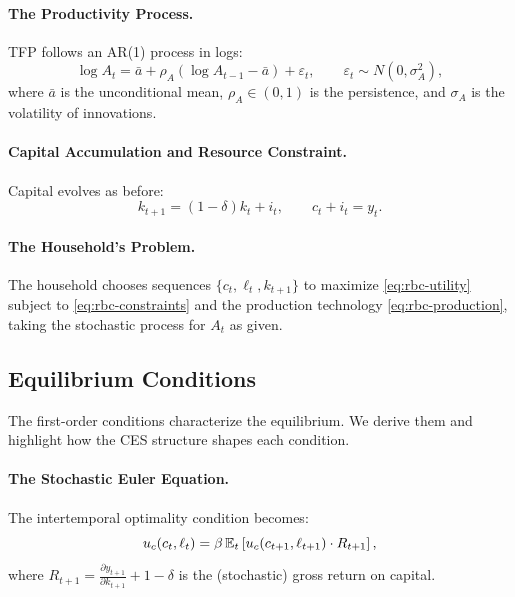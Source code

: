 \paragraph{The Productivity Process.}
TFP follows an AR(1) process in logs:
\begin{equation}
\log A_t = \bar{a} + \rho_A (\log A_{t-1} - \bar{a}) + \varepsilon_t, \qquad \varepsilon_t \sim N(0, \sigma_A^2),
\label{eq:tfp-process}
\end{equation}
where $\bar{a}$ is the unconditional mean, $\rho_A \in (0,1)$ is the persistence, and $\sigma_A$ is the volatility of innovations.

\paragraph{Capital Accumulation and Resource Constraint.}
Capital evolves as before:
\begin{equation}
k_{t+1} = (1 - \delta) k_t + i_t, \qquad c_t + i_t = y_t.
\label{eq:rbc-constraints}
\end{equation}

\paragraph{The Household's Problem.}
The household chooses sequences $\{c_t, \ell_t, k_{t+1}\}$ to maximize \cref{eq:rbc-utility} subject to \cref{eq:rbc-constraints} and the production technology \cref{eq:rbc-production}, taking the stochastic process for $A_t$ as given.

\subsection{Equilibrium Conditions}
\label{subsec:rbc-equilibrium}

The first-order conditions characterize the equilibrium. We derive them and highlight how the CES structure shapes each condition.

\paragraph{The Stochastic Euler Equation.}
The intertemporal optimality condition becomes:
\begin{equation}
u_c(c_t, \ell_t) = \beta \, \mathbb{E}_t \left[ u_c(c_{t+1}, \ell_{t+1}) \cdot R_{t+1} \right],
\label{eq:stochastic-euler}
\end{equation}
where $R_{t+1} = \frac{\partial y_{t+1}}{\partial k_{t+1}} + 1 - \delta$ is the (stochastic) gross return on capital.

